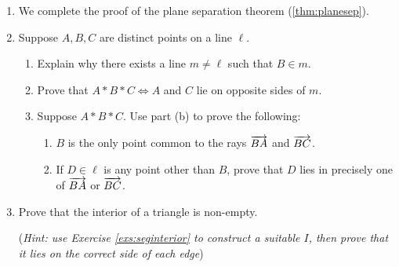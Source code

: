\begin{exercises}
\begin{enumerate}
  
  \item\label{exs:bernays} We complete the proof of the plane separation theorem (\ref{thm:planesep}).
  
  
  \item Suppose $A,B,C$ are distinct points on a line $\ell$.
  \begin{enumerate}
    \item Explain why there exists a line $m\neq \ell$ such that $B\in m$.
    \item Prove that $A*B*C\iff A$ and $C$ lie on opposite sides of $m$.
    \item Suppose $A*B*C$. Use part (b) to prove the following:
    \begin{enumerate}
			\item $B$ is the only point common to the rays $\overrightarrow{BA}$ and $\overrightarrow{BC}$.
			\item If $D\in\ell$ is any point other than $B$, prove that $D$ lies in precisely one of $\overrightarrow{BA}$ or $\overrightarrow{BC}$.
		\end{enumerate}
  \end{enumerate}
  
  
  \item\label{exs:seginfinite} Prove that the interior of a triangle is non-empty.\par
  (\emph{Hint: use Exercise \ref{exs:seginterior} to construct a suitable $I$, then prove that it lies on the correct side of each edge})
  
\end{enumerate}
\end{exercises}


